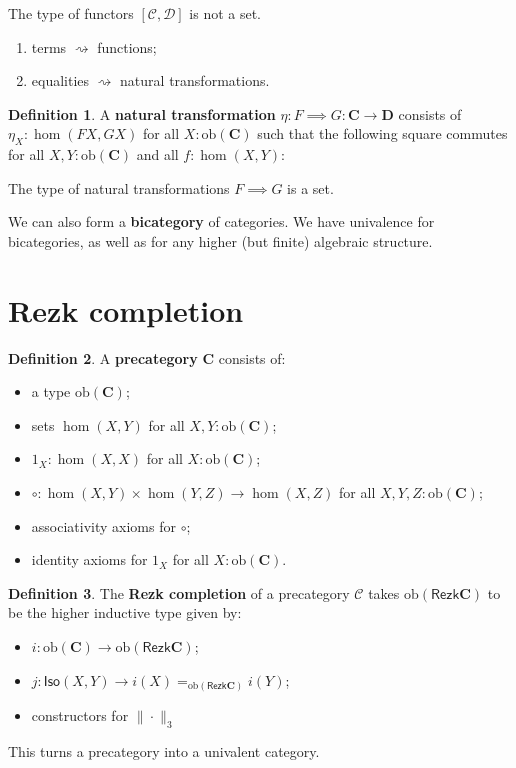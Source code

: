 \documentclass{amsart}
\theoremstyle{definition}
\newtheorem{defn}{Definition}[section]
\newcommand{\Rezk}{\ensuremath{\mathsf{Rezk}}}
\newcommand{\Iso}{\ensuremath{\mathsf{Iso}}}
\newcommand{\ob}[1]{\ensuremath{\mathrm{ob}{(\cat{#1})}}}
\newcommand{\cat}[1]{\ensuremath{\mathbf{#1}}}
\renewcommand{\emph}{\textbf}
\begin{document}
The type of functors $[\mathcal C, \mathcal D]$ is not a set.
\begin{enumerate}
    \item terms $\rightsquigarrow$ functions;
    \item equalities $\rightsquigarrow$ natural transformations.
\end{enumerate}

\begin{defn}
    A \emph{natural transformation} $\eta: F \implies G: \mathbf{C}\to\mathbf{D}$ consists of $\eta_X:\hom(FX,GX)$ for all $X:\ob{C}$ such that the following square commutes for all $X,Y:\ob{C}$ and all $f:\hom(X,Y)$:

\begin{center}
\end{center}
\end{defn}

The type of natural transformations $F\implies G$ is a set.

We can also form a \emph{bicategory} of categories. We have univalence for bicategories, as well as for any higher (but finite) algebraic structure.

\section{Rezk completion}

\begin{defn}
    A \textbf{precategory} $\cat{C}$ consists of:
    \begin{itemize}
        \item a type $\ob{C}$;
        \item sets $\hom (X,Y)$ for all $X,Y:\ob{C}$;
        \item $1_X : \hom(X,X) $ for all  $X : \ob{C}$;
        \item $\circ : \hom(X,Y)\times \hom(Y,Z)\to \hom(X,Z) $ for all $X, Y, Z : \ob{C}$;
        \item associativity axioms for $\circ$;
        \item identity axioms for $1_X$ for all $X : \ob{C}$.
    \end{itemize}
\end{defn}

\begin{defn}
    The \emph{Rezk completion} of a precategory $\mathcal C$ takes $\ob{\Rezk C}$ to be the higher inductive type given by:
    \begin{itemize}
        \item $i : \ob{C} \to \ob{\Rezk C}$;
        \item $j : \Iso(X,Y) \to i(X) \mathbf{=}_{\ob{\Rezk C}} i(Y)$;
        \item constructors for $\| \cdot \|_3$
    \end{itemize}
    This turns a precategory into a univalent category.
\end{defn}
\end{document}
